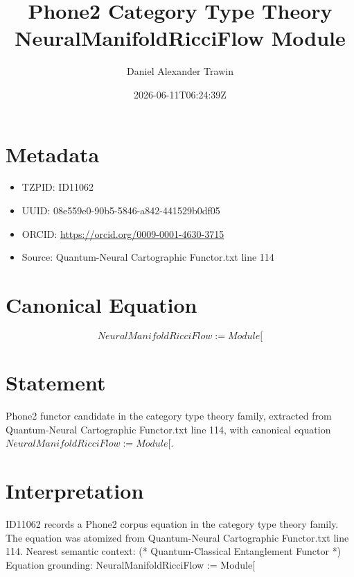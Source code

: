 \documentclass[11pt]{article}
\title{Phone2 Category Type Theory NeuralManifoldRicciFlow Module}
\author{Daniel Alexander Trawin}
\date{2026-06-11T06:24:39Z}
\begin{document}
\maketitle
\section*{Metadata}
\begin{itemize}
\item TZPID: ID11062
\item UUID: 08e559e0-90b5-5846-a842-441529b0df05
\item ORCID: \url{https://orcid.org/0009-0001-4630-3715}
\item Source: Quantum-Neural Cartographic Functor.txt line 114
\end{itemize}
\section*{Canonical Equation}
\[
NeuralManifoldRicciFlow := Module[
\]
\section*{Statement}
Phone2 functor candidate in the category type theory family, extracted from Quantum-Neural Cartographic Functor.txt line 114, with canonical equation $NeuralManifoldRicciFlow := Module[$.
\section*{Interpretation}
ID11062 records a Phone2 corpus equation in the category type theory family. The equation was atomized from Quantum-Neural Cartographic Functor.txt line 114. Nearest semantic context: (* Quantum-Classical Entanglement Functor *) Equation grounding: NeuralManifoldRicciFlow := Module[
\end{document}
